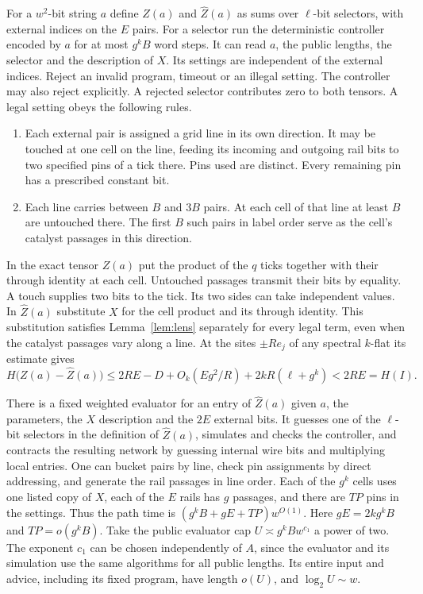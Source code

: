 For a $w^2$-bit string $a$ define $Z(a)$ and $\widehat Z(a)$ as sums over
$\ell$-bit selectors, with external indices on the $E$ pairs. For a
selector run the deterministic controller encoded by $a$ for at most
$g^kB$ word steps. It can read $a$, the public lengths, the selector
and the description of $X$. Its settings are independent of the external
indices. Reject an invalid program, timeout or an illegal setting.
The controller may also reject explicitly. A rejected selector contributes
zero to both tensors. A legal setting obeys the following rules.
\begin{enumerate}
\item Each external pair is assigned a grid line in its own direction.
It may be touched at one cell on the line, feeding its incoming and
outgoing rail bits to two specified pins of a tick there. Pins used are
distinct. Every remaining pin has a prescribed constant bit.
\item Each line carries between $B$ and $3B$ pairs. At each cell of
that line at least $B$ are untouched there. The first $B$ such pairs
in label order serve as the cell's catalyst passages in this direction.
\end{enumerate}
In the exact tensor $Z(a)$ put the product of the $q$ ticks together
with their through identity at each cell. Untouched passages transmit
their bits by equality. A touch supplies two bits to the tick. Its
two sides can take independent values. In $\widehat Z(a)$ substitute
$X$ for the cell product and its through identity. This substitution
satisfies Lemma~\ref{lem:lens} separately for every legal term, even
when the catalyst passages vary along a line. At the sites $\pm R e_j$
of any spectral $k$-flat its estimate gives
\begin{equation}\label{eq:diagonal-price}
 H\bigl(Z(a)-\widehat Z(a)\bigr)
 \le 2RE-D+O_k(Eg^2/R)+2kR(\ell+g^k)<2RE=H(I).
\end{equation}

There is a fixed weighted evaluator for an entry of $\widehat Z(a)$
given $a$, the parameters, the $X$ description and the $2E$ external
bits. It guesses one of the $\ell$-bit selectors in the definition of
$\widehat Z(a)$, simulates and checks the controller,
and contracts the resulting network by guessing internal wire bits
and multiplying local entries. One can bucket pairs by line, check
pin assignments by direct addressing, and generate the rail passages
in line order. Each of the $g^k$ cells uses one listed copy of $X$, each of the $E$
rails has $g$ passages, and there are $TP$ pins in the settings.
Thus the path time is $(g^kB+gE+TP)w^{O(1)}$.
Here $gE=2kg^kB$ and $TP=o(g^kB)$. Take the public evaluator cap
$U\asymp g^kB w^{c_1}$ a power of two. The exponent $c_1$ can be
chosen independently of $A$, since the evaluator and its simulation
use the same algorithms for all public lengths. Its entire input and
advice, including its fixed program, have length $o(U)$, and
$\log_2 U\sim w$.

